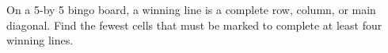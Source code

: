 On a 5-by 5 bingo board, a winning line is a complete row, column, or main diagonal. Find the fewest cells that must be marked to complete at least four winning lines.
